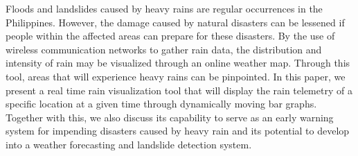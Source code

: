 \begin{thesisabstract}
Floods and landslides caused by heavy rains are regular occurrences in the Philippines. However, the damage caused by natural disasters can be lessened if people within the affected areas can prepare for these disasters. By the use of wireless communication networks to gather rain data, the distribution and intensity of rain may be visualized through an online weather map. Through this tool, areas that will experience heavy rains can be pinpointed. In this paper, we present a real time rain visualization tool that will display the rain telemetry of a specific location at a given time through dynamically moving bar graphs. Together with this, we also discuss its capability to serve as an early warning system for impending disasters caused by heavy rain and its potential to develop into a weather forecasting and landslide detection system.
\end{thesisabstract}